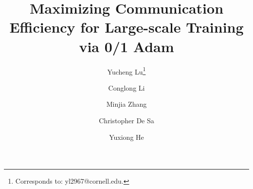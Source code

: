 \documentclass{article}
\title{Maximizing Communication Efficiency for Large-scale Training via 0/1 Adam}
\author[2]{Yucheng Lu\thanks{Corresponds to: yl2967@cornell.edu.}}
\author[1]{Conglong Li}
\author[1]{Minjia Zhang}
\author[2]{Christopher De Sa}
\author[1]{Yuxiong He}
\affil[1]{Microsoft}
\affil[2]{Department of Computer Science, Cornell\ University}
\date{}
\begin{document}
\maketitle











\newpage
\appendix
\onecolumn




\end{document}
